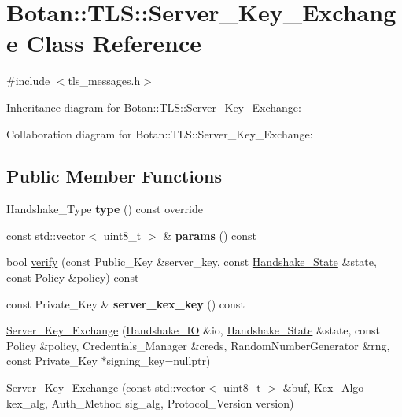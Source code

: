 \hypertarget{class_botan_1_1_t_l_s_1_1_server___key___exchange}{}\section{Botan\+:\+:T\+LS\+:\+:Server\+\_\+\+Key\+\_\+\+Exchange Class Reference}
\label{class_botan_1_1_t_l_s_1_1_server___key___exchange}


{\ttfamily \#include $<$tls\+\_\+messages.\+h$>$}



Inheritance diagram for Botan\+:\+:T\+LS\+:\+:Server\+\_\+\+Key\+\_\+\+Exchange\+:


Collaboration diagram for Botan\+:\+:T\+LS\+:\+:Server\+\_\+\+Key\+\_\+\+Exchange\+:
\subsection*{Public Member Functions}
\begin{DoxyCompactItemize}
\item 
\mbox{\label{class_botan_1_1_t_l_s_1_1_server___key___exchange_a4edb7eebfc55b3d18dc6a18b63091655}} 
Handshake\+\_\+\+Type {\bfseries type} () const override
\item 
\mbox{\label{class_botan_1_1_t_l_s_1_1_server___key___exchange_af5966fedc34858a66ea1f8a74f5abb12}} 
const std\+::vector$<$ uint8\+\_\+t $>$ \& {\bfseries params} () const
\item 
bool \mbox{\hyperlink{class_botan_1_1_t_l_s_1_1_server___key___exchange_a0faea67530e26fe74f163b481d56ffc1}{verify}} (const Public\+\_\+\+Key \&server\+\_\+key, const \mbox{\hyperlink{class_botan_1_1_t_l_s_1_1_handshake___state}{Handshake\+\_\+\+State}} \&state, const Policy \&policy) const
\item 
\mbox{\label{class_botan_1_1_t_l_s_1_1_server___key___exchange_acb877ec47d50d066fbee56f2e42b69af}} 
const Private\+\_\+\+Key \& {\bfseries server\+\_\+kex\+\_\+key} () const
\item 
\mbox{\hyperlink{class_botan_1_1_t_l_s_1_1_server___key___exchange_ae98108eac7f710925eb16550a3adfbb2}{Server\+\_\+\+Key\+\_\+\+Exchange}} (\mbox{\hyperlink{class_botan_1_1_t_l_s_1_1_handshake___i_o}{Handshake\+\_\+\+IO}} \&io, \mbox{\hyperlink{class_botan_1_1_t_l_s_1_1_handshake___state}{Handshake\+\_\+\+State}} \&state, const Policy \&policy, Credentials\+\_\+\+Manager \&creds, Random\+Number\+Generator \&rng, const Private\+\_\+\+Key $\ast$signing\+\_\+key=nullptr)
\item 
\mbox{\hyperlink{class_botan_1_1_t_l_s_1_1_server___key___exchange_a0d4cd9517e4cafacb1217cec99bd0035}{Server\+\_\+\+Key\+\_\+\+Exchange}} (const std\+::vector$<$ uint8\+\_\+t $>$ \&buf, Kex\+\_\+\+Algo kex\+\_\+alg, Auth\+\_\+\+Method sig\+\_\+alg, Protocol\+\_\+\+Version version)
\end{DoxyCompactItemize}


